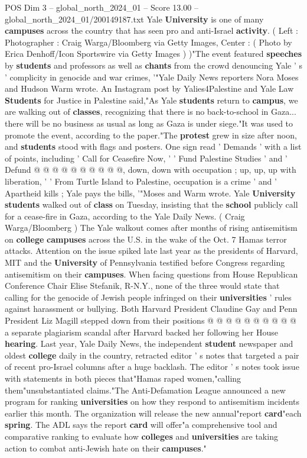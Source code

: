 \begin{textsample}{POS Dim 3 – global\_north\_2024\_01 – Score 13.00 – global\_north\_2024\_01/200149187.txt}  \label{ex:f3_pos_222}
Yale \textbf{University} is one of many \textbf{campuses} across the country that has seen pro and anti-Israel \textbf{activity}. ( Left : Photographer : Craig Warga/Bloomberg via Getty Images, Center : ( Photo by Erica Denhoff/Icon Sportswire via Getty Images ) )"The event featured \textbf{speeches} by \textbf{students} and professors as well as \textbf{chants} from the crowd denouncing Yale ' s ' complicity in genocide and war crimes, '"Yale Daily News reporters Nora Moses and Hudson Warm wrote.
An Instagram post by Yalies4Palestine and Yale Law \textbf{Students} for Justice in Palestine said,"As Yale \textbf{students} return to \textbf{campus}, we are walking out of \textbf{classes}, recognizing that there is no back-to-school in Gaza... there will be no business as usual as long as Gaza is under siege."It was used to promote the event, according to the paper."The \textbf{protest} grew in size after noon, and \textbf{students} stood with flags and posters.
One sign read ' Demands ' with a list of points, including ' Call for Ceasefire Now, ' ' Fund Palestine Studies ' and ' Defund @ @ @ @ @ @ @ @ @ @, down, down with occupation ; up, up, up with liberation, ' ' From Turtle Island to Palestine, occupation is a crime ' and ' Apartheid kills ; Yale pays the bills, '"Moses and Warm wrote.
Yale \textbf{University} \textbf{students} walked out of \textbf{class} on Tuesday, insisting that the \textbf{school} publicly call for a cease-fire in Gaza, according to the Yale Daily News. ( Craig Warga/Bloomberg ) The Yale walkout comes after months of rising antisemitism on \textbf{college} \textbf{campuses} across the U.S. in the wake of the Oct. 7 Hamas terror attacks.
Attention on the issue spiked late last year as the presidents of Harvard, MIT and the \textbf{University} of Pennsylvania testified before Congress regarding antisemitism on their \textbf{campuses}.
When facing questions from House Republican Conference Chair Elise Stefanik, R-N.Y., none of the three would state that calling for the genocide of Jewish people infringed on their \textbf{universities} ' rules against harassment or bullying.
Both Harvard President Claudine Gay and Penn President Liz Magill stepped down from their positions @ @ @ @ @ @ @ @ @ @ a separate plagiarism scandal after Harvard backed her following her House \textbf{hearing}.
Last year, Yale Daily News, the independent \textbf{student} newspaper and oldest \textbf{college} daily in the country, retracted editor ' s notes that targeted a pair of recent pro-Israel columns after a huge backlash.
The editor ' s notes took issue with statements in both pieces that"Hamas raped women,"calling them"unsubstantiated claims."The Anti-Defamation League announced a new program for ranking \textbf{universities} on how they respond to antisemitism incidents earlier this month.
The organization will release the new annual"report \textbf{card}"each \textbf{spring}.
The ADL says the report \textbf{card} will offer"a comprehensive tool and comparative ranking to evaluate how \textbf{colleges} and \textbf{universities} are taking action to combat anti-Jewish hate on their \textbf{campuses}."


\end{textsample}
